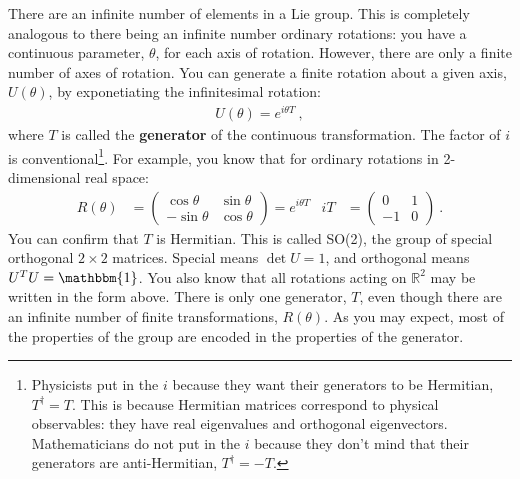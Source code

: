 \documentclass[12pt]{article}
\numberwithin{equation}{section}    %
\begin{document}
There are an infinite number of elements in a Lie group.
%
This is completely analogous to there being an infinite number ordinary rotations: you have a continuous parameter, $\theta$, for each axis of rotation. However, there are only a finite number of axes of rotation. You can generate a finite rotation about a given axis, $U(\theta)$, by exponetiating the infinitesimal rotation:
\begin{align}
	U(\theta) = e^{i\theta T} \ ,
\end{align}
where $T$ is called the \textbf{generator} of the continuous transformation. The factor of $i$ is conventional\footnote{Physicists put in the $i$ because they want their generators to be Hermitian, $T^\dag = T$. This is because Hermitian matrices correspond to physical observables: they have real eigenvalues and orthogonal eigenvectors. Mathematicians do not put in the $i$ because they don't mind that their generators are anti-Hermitian, $T^\dag = -T$.}. For example, you know that for ordinary rotations in 2-dimensional real space:
\begin{align}
	R(\theta) &=
	\begin{pmatrix}
		\cos\theta & \sin\theta\\
		-\sin\theta & \cos \theta
	\end{pmatrix}
	= 
	e^{i\theta T}
	&
	iT &= 
	\begin{pmatrix}
		0 & 1\\
		-1 & 0
	\end{pmatrix} \ .
\end{align}
You can confirm that $T$ is Hermitian. This is called SO(2), the group of special orthogonal $2\times 2$ matrices. Special means $\det U =1$, and orthogonal means $U^TU = \mathbbm{1}$. You also know that all rotations acting on $\mathbb{R}^2$ may be written in the form above. There is only one generator, $T$, even though there are an infinite number of finite transformations, $R(\theta)$. As you may expect, most of the properties of the group are encoded in the properties of the generator.
\end{document}
